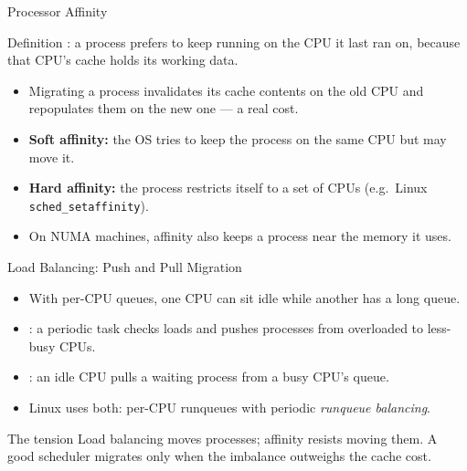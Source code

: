 \documentclass[aspectratio=169]{beamer}
\begin{document}
\begin{frame}{Processor Affinity}
  \begin{block}{Definition}
    : a process prefers to keep running on the CPU
    it last ran on, because that CPU's cache holds its working data.
  \end{block}
  \begin{itemize}
    \item Migrating a process invalidates its cache contents on the old CPU
      and repopulates them on the new one --- a real cost.
    \item \textbf{Soft affinity:} the OS tries to keep the process on the
      same CPU but may move it.
    \item \textbf{Hard affinity:} the process restricts itself to a set of
      CPUs (e.g.\ Linux \texttt{sched\_setaffinity}).
    \item On NUMA machines, affinity also keeps a process near the memory
      it uses.
  \end{itemize}
\end{frame}

\begin{frame}{Load Balancing: Push and Pull Migration}
  \begin{itemize}
    \item With per-CPU queues, one CPU can sit idle while another has a
      long queue.
    \item {}: a periodic task checks loads and pushes
      processes from overloaded to less-busy CPUs.
    \item {}: an idle CPU pulls a waiting process from a
      busy CPU's queue.
    \item Linux uses both: per-CPU runqueues with periodic
      \emph{runqueue balancing}.
  \end{itemize}
  \vspace{0.15cm}
  \begin{alertblock}{The tension}
    Load balancing moves processes; affinity resists moving them. A good
    scheduler migrates only when the imbalance outweighs the cache cost.
  \end{alertblock}
\end{frame}
\end{document}
